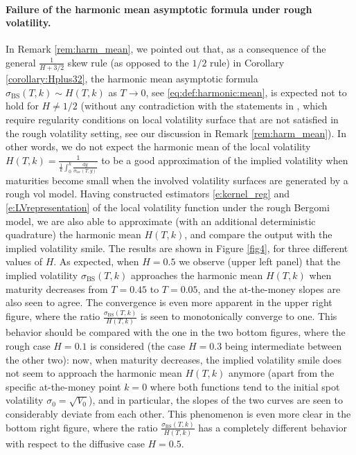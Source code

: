 \documentclass[11pt]{article}
\theoremstyle{plain}
\theoremstyle{definition}
\theoremstyle{remark}
\newcommand{\dd}{\mathrm{d}}
\newcommand{\1}{\mathbf{1}}
\numberwithin{equation}{section}
\def\sigDup{\sigma_\mathrm{loc}}
\def\sigBS{\sigma_\mathrm{BS}}
\begin{document}
\paragraph{Failure of the harmonic mean asymptotic formula under rough volatility.}
In Remark \ref{rem:harm_mean}, we pointed out that, as a consequence of the general $\frac{1}{H+3/2}$ skew rule (as opposed to the $1/2$ rule) in Corollary \ref{corollary:Hplus32}, the harmonic mean asymptotic formula  $\sigBS(T, k) \sim H(T,k)$ as $T \to 0$, see \eqref{eq:def:harmonic:mean}, is expected not to hold for $H \neq 1/2$ (without any contradiction with the statements in \cite{BBF02}, which require regularity conditions on local volatility surface that are not satisfied in the rough volatility setting, see our discussion in Remark \ref{rem:harm_mean}).
In other words, we do not expect the harmonic mean of the local volatility $H(T,k) = \frac 1{\frac 1k \int_0^k \frac {\dd y}{\sigDup(T,y)}}$ to be a good approximation of the implied volatility when maturities become small when the involved volatility surfaces are generated by a rough vol model.
Having constructed estimators \eqref{e:kernel_reg}
 and \eqref{e:LVrepresentation} of the local volatility function under the rough Bergomi model, we are also able to approximate (with an additional deterministic quadrature) the harmonic mean $H(T,k)$, and compare the output with the implied volatility smile.
The results are shown in Figure \ref{fig4}, for three different  values of $H$.
As expected, when $H=0.5$ we observe (upper left panel) that the implied volatility $\sigBS(T,k)$ approaches the harmonic mean $H(T,k)$ when maturity decreases from $T=0.45$ to $T=0.05$, and the at-the-money slopes are also seen to agree. The convergence is even more apparent in the upper right figure, where the ratio $\frac{\sigBS(T,k)}{H(T,k)}$ is seen to monotonically converge to one.
This behavior should be compared with the one in the two bottom figures, where the rough case $H=0.1$ is considered (the case $H=0.3$ being intermediate between the other two): now, when maturity decreases, the implied volatility smile does not seem to approach the harmonic mean $H(T,k)$ anymore (apart from the specific at-the-money point $k=0$ where both functions tend to the initial spot volatility $\sigma_0 = \sqrt{V_0}$), and in particular, the slopes of the two curves are seen to considerably deviate from each other. This phenomenon is even more clear in the bottom right figure, where the ratio $\frac{\sigBS(T,k)}{H(T,k)}$ has a completely different behavior with respect to the diffusive case $H=0.5$.
\end{document}
